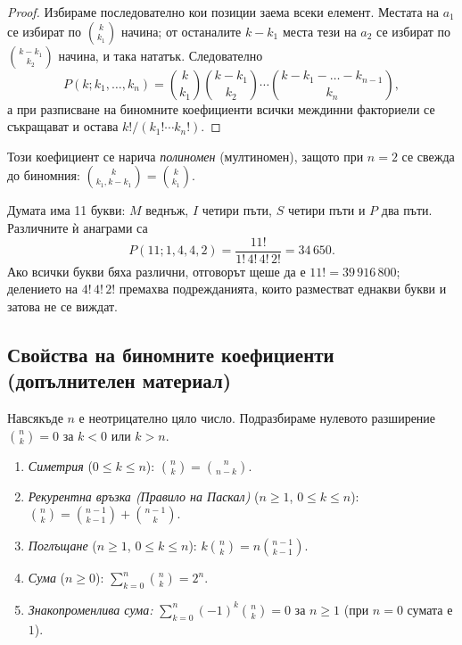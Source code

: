 \begin{proof}
Избираме последователно кои позиции заема всеки елемент. Местата на $a_1$ се избират по
$\binom{k}{k_1}$ начина; от останалите $k - k_1$ места тези на $a_2$ се избират по
$\binom{k-k_1}{k_2}$ начина, и така нататък. Следователно
\[
P(k; k_1, \dots, k_n)
 = \binom{k}{k_1}\binom{k-k_1}{k_2} \cdots \binom{k-k_1-\dots-k_{n-1}}{k_n} ,
\]
а при разписване на биномните коефициенти всички междинни факториели се съкращават и
остава $k!/(k_1! \cdots k_n!)$.
\end{proof}

Този коефициент се нарича \emph{полиномен} (мултиномен), защото при $n=2$ се свежда до
биномния: $\binom{k}{k_1, k-k_1} = \binom{k}{k_1}$.

\begin{example}\label{ex:15-anagram}
Думата има 11 букви: $M$ веднъж, $I$ четири пъти, $S$ четири пъти и $P$ два пъти.
Различните ѝ анаграми са
\[
P(11; 1, 4, 4, 2) = \frac{11!}{1!\,4!\,4!\,2!} = 34\,650 .
\]
Ако всички букви бяха различни, отговорът щеше да е $11! = 39\,916\,800$; делението на
$4!\,4!\,2!$ премахва подрежданията, които разместват еднакви букви и затова не се виждат.
\end{example}

\subsection{Свойства на биномните коефициенти \textnormal{(допълнителен материал)}}

\begin{prop}\label{prop:binom-props}
Навсякъде $n$ е неотрицателно цяло число. Подразбираме нулевото разширение $\binom{n}{k}=0$ за $k<0$ или $k>n$.
\begin{enumerate}
    \item \emph{Симетрия} ($0\le k\le n$): $\displaystyle \binom{n}{k} = \binom{n}{n-k}$.
    \item \emph{Рекурентна връзка (Правило на Паскал)} ($n\ge1$, $0\le k\le n$): $\displaystyle \binom{n}{k} = \binom{n-1}{k-1} + \binom{n-1}{k}$.
    \item \emph{Поглъщане} ($n\ge1$, $0\le k\le n$): $\displaystyle k\binom{n}{k} = n\binom{n-1}{k-1}$.
    \item \emph{Сума} ($n\ge0$): $\displaystyle \sum_{k=0}^{n} \binom{n}{k} = 2^n$.
    \item \emph{Знакопроменлива сума:} $\displaystyle \sum_{k=0}^{n} (-1)^k \binom{n}{k} = 0$ за $n \ge 1$ (при $n = 0$ сумата е $1$).
\end{enumerate}
\end{prop}

